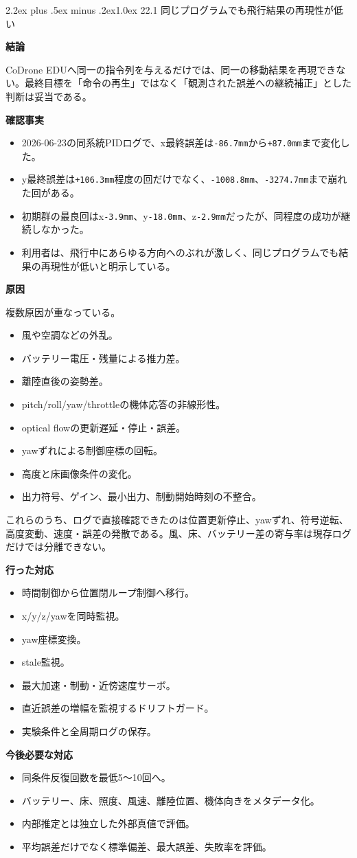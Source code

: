 \documentclass[10pt,a4paper,openany]{ltjsbook}
\makeatletter
\renewcommand\section{\@startsection{section}{1}{0pt}%
  {2.2ex plus .5ex minus .2ex}{1.0ex}%
  {\sffamily\Large\bfseries\color{ReportNavy}}}
\newcommand{\reportlabel}[1]{%
  \par\vspace{0.55em}%
  \noindent\colorbox{ReportTeal}{%
    \parbox{\dimexpr\linewidth-2\fboxsep\relax}{%
      \sffamily\bfseries\color{white}#1%
    }%
  }\par\vspace{0.20em}%
}
\makeatother
\begin{document}
\section{22.1 同じプログラムでも飛行結果の再現性が低い}
\reportlabel{結論}
CoDrone EDUへ同一の指令列を与えるだけでは、同一の移動結果を再現できない。最終目標を「命令の再生」ではなく「観測された誤差への継続補正」とした判断は妥当である。\par
\reportlabel{確認事実}
\begin{itemize}
\item 2026-06-23の同系統PIDログで、x最終誤差は\texttt{-86.7mm}から\texttt{+87.0mm}まで変化した。
\item y最終誤差は\texttt{+106.3mm}程度の回だけでなく、\texttt{-1008.8mm}、\texttt{-3274.7mm}まで崩れた回がある。
\item 初期群の最良回はx\texttt{-3.9mm}、y\texttt{-18.0mm}、z\texttt{-2.9mm}だったが、同程度の成功が継続しなかった。
\item 利用者は、飛行中にあらゆる方向へのぶれが激しく、同じプログラムでも結果の再現性が低いと明示している。
\end{itemize}
\reportlabel{原因}
複数原因が重なっている。\par
\begin{itemize}
\item 風や空調などの外乱。
\item バッテリー電圧・残量による推力差。
\item 離陸直後の姿勢差。
\item pitch/roll/yaw/throttleの機体応答の非線形性。
\item optical flowの更新遅延・停止・誤差。
\item yawずれによる制御座標の回転。
\item 高度と床画像条件の変化。
\item 出力符号、ゲイン、最小出力、制動開始時刻の不整合。
\end{itemize}
これらのうち、ログで直接確認できたのは位置更新停止、yawずれ、符号逆転、高度変動、速度・誤差の発散である。風、床、バッテリー差の寄与率は現存ログだけでは分離できない。\par
\reportlabel{行った対応}
\begin{itemize}
\item 時間制御から位置閉ループ制御へ移行。
\item x/y/z/yawを同時監視。
\item yaw座標変換。
\item stale監視。
\item 最大加速・制動・近傍速度サーボ。
\item 直近誤差の増幅を監視するドリフトガード。
\item 実験条件と全周期ログの保存。
\end{itemize}
\reportlabel{今後必要な対応}
\begin{itemize}
\item 同条件反復回数を最低5〜10回へ。
\item バッテリー、床、照度、風速、離陸位置、機体向きをメタデータ化。
\item 内部推定とは独立した外部真値で評価。
\item 平均誤差だけでなく標準偏差、最大誤差、失敗率を評価。
\end{itemize}
\end{document}
